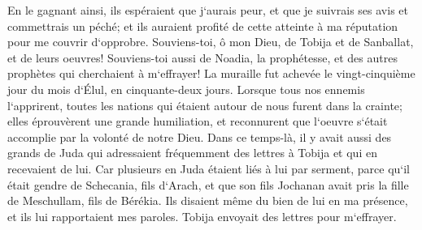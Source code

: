 \verse En le gagnant ainsi, ils espéraient que j`aurais peur, et que je suivrais ses avis et commettrais un péché; et ils auraient profité de cette atteinte à ma réputation pour me couvrir d`opprobre. 
\verse Souviens-toi, ô mon Dieu, de Tobija et de Sanballat, et de leurs oeuvres! Souviens-toi aussi de Noadia, la prophétesse, et des autres prophètes qui cherchaient à m`effrayer! 
\verse La muraille fut achevée le vingt-cinquième jour du mois d`Élul, en cinquante-deux jours. 
\verse Lorsque tous nos ennemis l`apprirent, toutes les nations qui étaient autour de nous furent dans la crainte; elles éprouvèrent une grande humiliation, et reconnurent que l`oeuvre s`était accomplie par la volonté de notre Dieu. 
\verse Dans ce temps-là, il y avait aussi des grands de Juda qui adressaient fréquemment des lettres à Tobija et qui en recevaient de lui. 
\verse Car plusieurs en Juda étaient liés à lui par serment, parce qu`il était gendre de Schecania, fils d`Arach, et que son fils Jochanan avait pris la fille de Meschullam, fils de Bérékia. 
\verse Ils disaient même du bien de lui en ma présence, et ils lui rapportaient mes paroles. Tobija envoyait des lettres pour m`effrayer. 

